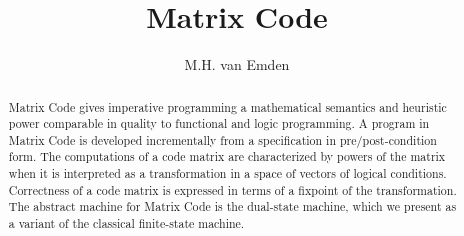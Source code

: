 \documentclass[preprint,11pt]{elsarticle}
\begin{document}
\title{Matrix Code}

\author{M.H. van Emden}

\maketitle
\begin{abstract}
Matrix Code gives imperative programming a mathematical semantics
and heuristic power comparable in quality to functional and logic
programming.  A program in Matrix Code is developed incrementally
from a specification in pre/post-condition form.  The computations
of a code matrix are characterized by powers of the matrix when it
is interpreted as a transformation in a space of vectors of logical
conditions.  Correctness of a code matrix is expressed in terms of
a fixpoint of the transformation.  The abstract machine for Matrix
Code is the dual-state machine, which we present as a variant of
the classical finite-state machine.

\end{abstract}


\newtheorem{theorem}{Theorem}{}
\newtheorem{definition}{Definition}{}
\newtheorem{lemma}{Lemma}{}

\newcommand{\emln}{$\;$\\} \newcommand{\lmnt}[1]{\parbox{1.0in}{
   {\footnotesize {\emln \tt #1 }} \emln}}
\newcommand{\lmntWdth}[2]{\parbox{#1in}{
   {\footnotesize {\emln \tt #2 }} \emln}}
\newcommand{\nc}[1]{\lmntWdth{0.5}{#1}} \newcommand{\emp}{\lmnt{$\;$}} 

\newcommand{\set}[2]{\{#1 \mid #2\}}
\newcommand{\bk}[3]
  {{\tt \{#1\}#2\{#3\}}}
\newcommand{\brr}[2]{{\tt \{#1\}#2}}
\newcommand{\ktt}[2]{#1\{#2\}}

\newcommand{\vc}[3]{${\mathbf V}_{\mbox{{\tt #2}}}(#1;#3)$}
\newcommand{\trpl}[3]{{\tt \{#1\}#2\{#3\}}}
\newcommand{\mpr}[2]{{\tt #1:#2}} \newcommand{\mst}[2]{{\tt (#1,#2)}} 

\newcommand{\pr}[2]{\ensuremath{\langle #1,#2 \rangle}}

\newcommand{\ccc}{{\tt C}}
\newcommand{\cpp}{{\tt C++}}

\newcommand{\mc}[1]{\mathcal{#1}}
\end{document}
